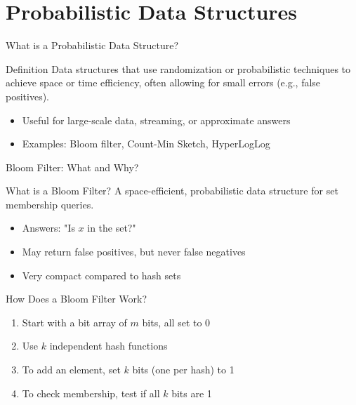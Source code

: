 \documentclass[aspectratio=169]{beamer}
\begin{document}
\section{Probabilistic Data Structures}

\begin{frame}{What is a Probabilistic Data Structure?}
  \begin{block}{Definition}
    Data structures that use randomization or probabilistic techniques to achieve space or time efficiency, often allowing for small errors (e.g., false positives).
  \end{block}
  \pause
  \begin{itemize}
    \item Useful for large-scale data, streaming, or approximate answers
    \item Examples: Bloom filter, Count-Min Sketch, HyperLogLog
  \end{itemize}
\end{frame}

\begin{frame}{Bloom Filter: What and Why?}
  \begin{block}{What is a Bloom Filter?}
    A space-efficient, probabilistic data structure for set membership queries.
  \end{block}
  \pause
  \begin{itemize}
    \item Answers: "Is $x$ in the set?"
    \item May return false positives, but never false negatives
    \item Very compact compared to hash sets
  \end{itemize}
\end{frame}

\begin{frame}{How Does a Bloom Filter Work?}
  \begin{enumerate}
    \item Start with a bit array of $m$ bits, all set to 0
          \pause
    \item Use $k$ independent hash functions
          \pause
    \item To add an element, set $k$ bits (one per hash) to 1
          \pause
    \item To check membership, test if all $k$ bits are 1
  \end{enumerate}
\end{frame}
\end{document}
